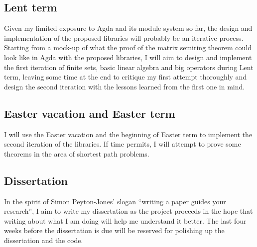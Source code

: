 \documentclass[a4paper]{scrartcl}
\begin{document}
\subsection{Lent term}

Given my limited exposure to Agda and its module system so far, the design and implementation of the proposed libraries will probably be an iterative process.
Starting from a mock-up of what the proof of the matrix semiring theorem could look like in Agda with the proposed libraries, I will aim to design and implement the first iteration of finite sets, basic linear algebra and big operators during Lent term, leaving some time at the end to critique my first attempt thoroughly and design the second iteration with the lessons learned from the first one in mind.

\subsection{Easter vacation and Easter term}

I will use the Easter vacation and the beginning of Easter term to implement the second iteration of the libraries. If time permits, I will attempt to prove some theorems in the area of shortest path problems.

\subsection{Dissertation}

In the spirit of Simon Peyton-Jones' slogan \enquote{writing a paper guides your research}, I aim to write my dissertation as the project proceeds in the hope that writing about what I am doing will help me understand it better. The last four weeks before the dissertation is due will be reserved for polishing up the dissertation and the code.

\printbibliography
\end{document}
